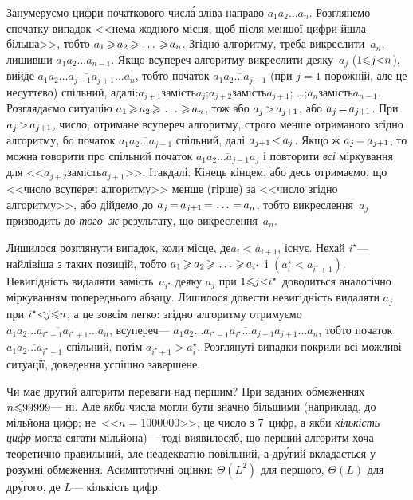 \label{text:proof-max-num-by-strike-out-one-digit}
Занумеруємо цифри початкового числ\'{а} зліва направо $\overline{a_1a_2\dots{}a_n}$.
Розглянемо спочатку випадок <<нема жодного місця, щоб після меншої цифри йшла більша>>, тобто $a_1\dib{{\>}}a_2\dib{{\>}}\dots\dib{{\>}}a_n$. Згідно алгоритму, треба викреслити~$a_n$, лишивши $\overline{a_1a_2\dots{}a_{n-1}}$. Якщо всупереч алгоритму викреслити деяку~$a_j$ ($1{\leqslant}j{<}n$), вийде $\overline{a_1a_2\dots{}a_{j-1}a_{j+1}\dots{}a_{n}}$, тобто початок $\overline{a_1a_2\dots{}a_{j-1}}$ (при $j{=}1$ порожній, але це несуттєво) спільний, а\nolinebreak[3] далі:\linebreak[1]
$a_{j+1}$\nolinebreak[1] замість\nolinebreak[3] $a_j$;\linebreak[1] 
$a_{j+2}$\nolinebreak[1] замість\nolinebreak[3] $a_{j+1}$;
\dots;\linebreak[1]
$a_{n}$\nolinebreak[1] замість\nolinebreak[3] $a_{n-1}$.
Розглядаємо ситуацію $a_1\dib{{\>}}a_2\dib{{\>}}\dots\dib{{\>}}a_n$, тож або $a_j\dib{{>}}a_{j+1}$, або $a_j\dib{{=}}a_{j+1}$. При $a_j\dib{{>}}a_{j+1}$, число, отримане всупереч алгоритму, строго менше отриманого згідно алгоритму, бо початок $\overline{a_1a_2\dots{}a_{j-1}}$ спільний, далі $a_{j+1}\dib{{<}}a_j$. Якщо ж $a_j\dib{{=}}a_{j+1}$, то можна говорити про спільний початок $\overline{a_1a_2\dots{}a_{j-1}a_j}$ і повторити \emph{всі} міркування для <<$a_{j+2}$\nolinebreak[1] замість\nolinebreak[3] $a_{j+1}$>>. І\nolinebreak[3] так\nolinebreak[2] далі. Кінець кінцем, або десь отримаємо, що <<число всупереч алгоритму>> менше (гірше) за <<число згідно алгоритму>>, або дійдемо до $a_j\dib{{=}}a_{j+1}\dib{{=}}\dots\dib{{=}}a_n$, тобто викреслення~$a_j$ призводить до \emph{того~ж} результату, що викреслення~$a_n$.

Лишилося розглянути випадок, коли місце, де\nolinebreak[3] $a_i{<}a_{i+1}$, існує. Нехай $i^{\star}$\nolinebreak[3] --- найлівіша з таких позицій, тобто $a_1\dib{{\>}}a_2\dib{{\>}}\dots\dib{{\>}}a_{i^{\star}}$ і $(a_i^{\star}{<}a_{i^{\star}+1})$. Невигідність видаляти замість~$a_{i^{\star}}$ деяку $a_j$ при $1{\leqslant}j{<}i^{\star}$ доводиться аналогічно міркуванням попереднього абзацу. Лишилося довести невигідність видаляти $a_j$ при $i^{\star}{<}j{\leqslant}n$, а це зовсім легко: згідно алгоритму отримуємо $\overline{a_1a_2\dots{}a_{i^{\star}-1}a_{i^{\star}+1}\dots{}a_{n}}$, всупереч\nolinebreak[3] --- $\overline{a_1a_2\dots{}a_{i^{\star}-1}a_{i^{\star}}\dots{}a_{j-1}a_{j+1}\dots{}a_{n}}$, тобто початок $\overline{a_1a_2\dots{}a_{i^{\star}-1}}$ спільний, потім ${a_{i^{\star}+1} > a_i^{\star}}$. Розглянуті випадки покрили всі можливі ситуації, доведення успішно завершене.

\myhrulefill

Чи має другий алгоритм переваги над першим? При заданих обмеженнях ${n{\leqslant}99999}$\nolinebreak[3] --- ні. Але \emph{якби} числа могли бути значно більшими (наприклад, до мільйона цифр; не~<<$n{=}1000000$>>, це число з 7~цифр, а якби \emph{кількість цифр} могла сягати мільйона)\nolinebreak[3] --- тоді виявилося\nolinebreak[3] б, що перший алгоритм хоча теоретично правильний, але неадекватно повільний, а др\'{у}гий вкладається у розумні обмеження. Асимптотичні оцінки: $\Theta(L^2)$ для першого, $\Theta(L)$ для др\'{у}гого, де $L$\nolinebreak[3] --- кількість цифр.

